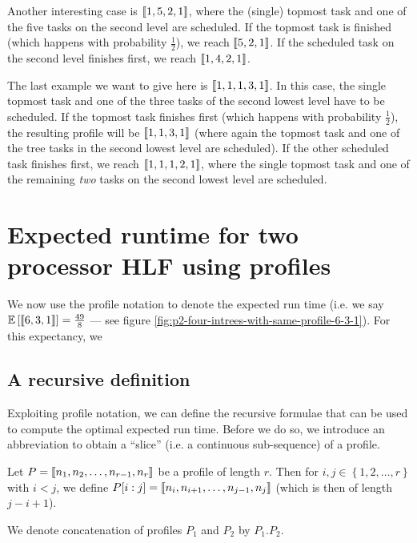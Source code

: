 
Another interesting case is $\left\llbracket 1,5,2,1 \right\rrbracket$, where the (single) topmost task and one of the five tasks on the second level are scheduled. If the topmost task is finished (which happens with probability $\frac{1}{2}$), we reach $\left\llbracket 5,2,1 \right\rrbracket$. If the scheduled task on the second level finishes first, we reach $\left\llbracket 1,4,2,1 \right\rrbracket$.

The last example we want to give here is $\left\llbracket 1,1,1,3,1 \right\rrbracket$. In this case, the single topmost task and one of the three tasks of the second lowest level have to be scheduled. If the topmost task finishes first (which happens with probability $\frac{1}{2}$), the resulting profile will be $\left\llbracket 1,1,3,1 \right\rrbracket$ (where again the topmost task and one of the tree tasks in the second lowest level are scheduled). If the other scheduled task finishes first, we reach $\left\llbracket 1,1,1,2,1 \right\rrbracket$, where the single topmost task and one of the remaining \emph{two} tasks on the second lowest level are scheduled.

\section{Expected runtime for two processor HLF using profiles}
\label{sec:p2-profiles-hlf-exp-runtime}

We now use the profile notation to denote the expected run time (i.e. we say $\mathbb{E}\left[ \left\llbracket 6,3,1 \right\rrbracket \right] = \frac{49}{8}$ --- see figure \ref{fig:p2-four-intrees-with-same-profile-6-3-1}). For this expectancy, we 

\subsection{A recursive definition}
\label{sec:p2-profile-exp-run-time-rec-def}

Exploiting profile notation, we can define the recursive formulae that can be used to compute the optimal expected run time. Before we do so, we introduce an abbreviation to obtain a ``slice'' (i.e. a continuous sub-sequence) of a profile.

\newcommand{\profileconcat}{.}
\begin{definition}
  Let $P=\left\llbracket n_1,n_2,\dots,n_{r-1},n_r \right\rrbracket$ be a profile of length $r$. Then for $i,j\in\left\{ 1,2,\dots,r \right\}$ with $i<j$, we define $P[i:j]=\left\llbracket n_i,n_{i+1},\dots,n_{j-1},n_j \right\rrbracket$ (which is then of length $j-i+1$).

  We denote concatenation of profiles $P_1$ and $P_2$ by $P_1 \profileconcat P_2$.
\end{definition}

